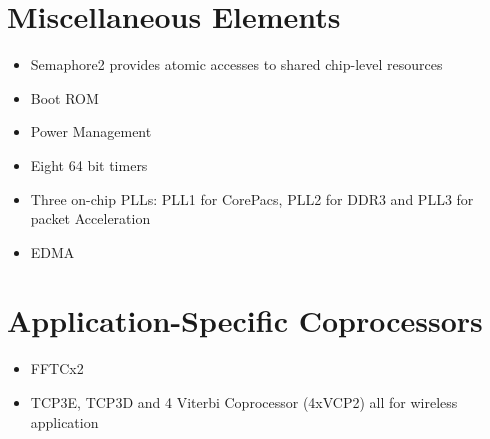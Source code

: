 \documentclass{article}
\begin{document}
\section{Miscellaneous Elements}
\begin{itemize}
\item Semaphore2 provides atomic accesses to shared chip-level
  resources
\item Boot ROM 
\item Power Management
\item Eight 64 bit timers
\item Three on-chip PLLs: PLL1 for CorePacs, PLL2 for DDR3 and PLL3
  for packet Acceleration
\item EDMA
\end{itemize}
\section{Application-Specific Coprocessors}
\begin{itemize}
\item FFTCx2
\item TCP3E, TCP3D and 4 Viterbi Coprocessor (4xVCP2) all for wireless application
\end{itemize}
\end{document}
